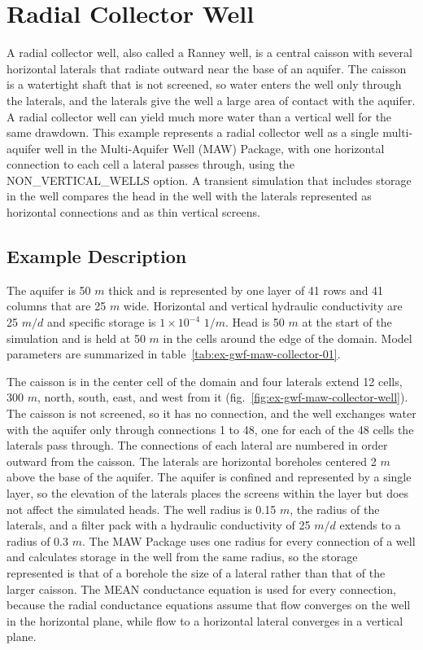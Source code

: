 \section{Radial Collector Well}

A radial collector well, also called a Ranney well, is a central caisson with several horizontal laterals that radiate outward near the base of an aquifer. The caisson is a watertight shaft that is not screened, so water enters the well only through the laterals, and the laterals give the well a large area of contact with the aquifer. A radial collector well can yield much more water than a vertical well for the same drawdown. This example represents a radial collector well as a single multi-aquifer well in the \mf Multi-Aquifer Well (MAW) Package, with one horizontal connection to each cell a lateral passes through, using the NON\_VERTICAL\_WELLS option. A transient simulation that includes storage in the well compares the head in the well with the laterals represented as horizontal connections and as thin vertical screens.

\subsection{Example Description}

The aquifer is 50 $m$ thick and is represented by one layer of 41 rows and 41 columns that are 25 $m$ wide. Horizontal and vertical hydraulic conductivity are 25 $m/d$ and specific storage is $1 \times 10^{-4}$ $1/m$. Head is 50 $m$ at the start of the simulation and is held at 50 $m$ in the cells around the edge of the domain. Model parameters are summarized in table~\ref{tab:ex-gwf-maw-collector-01}.

The caisson is in the center cell of the domain and four laterals extend 12 cells, 300 $m$, north, south, east, and west from it (fig.~\ref{fig:ex-gwf-maw-collector-well}). The caisson is not screened, so it has no connection, and the well exchanges water with the aquifer only through connections 1 to 48, one for each of the 48 cells the laterals pass through. The connections of each lateral are numbered in order outward from the caisson. The laterals are horizontal boreholes centered 2 $m$ above the base of the aquifer. The aquifer is confined and represented by a single layer, so the elevation of the laterals places the screens within the layer but does not affect the simulated heads. The well radius is 0.15 $m$, the radius of the laterals, and a filter pack with a hydraulic conductivity of 25 $m/d$ extends to a radius of 0.3 $m$. The MAW Package uses one radius for every connection of a well and calculates storage in the well from the same radius, so the storage represented is that of a borehole the size of a lateral rather than that of the larger caisson. The MEAN conductance equation is used for every connection, because the radial conductance equations assume that flow converges on the well in the horizontal plane, while flow to a horizontal lateral converges in a vertical plane.

